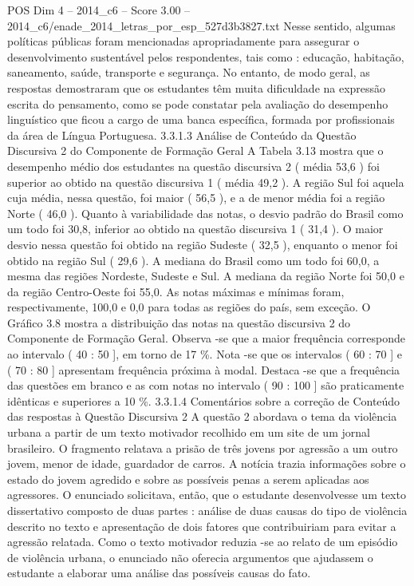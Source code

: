 \begin{textsample}{POS Dim 4 – 2014\_c6 – Score 3.00 – 2014\_c6/enade\_2014\_letras\_por\_esp\_527d3b3827.txt}
Nesse sentido, algumas políticas públicas foram mencionadas apropriadamente para assegurar o desenvolvimento sustentável pelos respondentes, tais como : educação, habitação, saneamento, saúde, transporte e segurança.
No entanto, de modo geral, as respostas demostraram que os estudantes têm muita dificuldade na expressão escrita do pensamento, como se pode constatar pela avaliação do desempenho linguístico que ficou a cargo de uma banca específica, formada por profissionais da área de Língua Portuguesa. 3.3.1.3 Análise de Conteúdo da Questão Discursiva 2 do Componente de Formação Geral A Tabela 3.13 mostra que o desempenho médio dos estudantes na questão discursiva 2 ( média 53,6 ) foi superior ao obtido na questão discursiva 1 ( média 49,2 ).
A região Sul foi aquela cuja média, nessa questão, foi maior ( 56,5 ), e a de menor média foi a região Norte ( 46,0 ).
Quanto à variabilidade das notas, o desvio padrão do Brasil como um todo foi 30,8, inferior ao obtido na questão discursiva 1 ( 31,4 ).
O maior desvio nessa questão foi obtido na região Sudeste ( 32,5 ), enquanto o menor foi obtido na região Sul ( 29,6 ).
A mediana do Brasil como um todo foi 60,0, a mesma das regiões Nordeste, Sudeste e Sul.
A mediana da região Norte foi 50,0 e da região Centro-Oeste foi 55,0.
As notas máximas e mínimas foram, respectivamente, 100,0 e 0,0 para todas as regiões do país, sem exceção.
O Gráfico 3.8 mostra a distribuição das notas na questão discursiva 2 do Componente de Formação Geral.
Observa -se que a maior frequência corresponde ao intervalo ( 40 : 50 ], em torno de 17 \%.
Nota -se que os intervalos ( 60 : 70 ] e ( 70 : 80 ] apresentam frequência próxima à modal.
Destaca -se que a frequência das questões em branco e as com notas no intervalo ( 90 : 100 ] são praticamente idênticas e superiores a 10 \%. 3.3.1.4 Comentários sobre a correção de Conteúdo das respostas à Questão Discursiva 2 A questão 2 abordava o tema da violência urbana a partir de um texto motivador recolhido em um site de um jornal brasileiro.
O fragmento relatava a prisão de três jovens por agressão a um outro jovem, menor de idade, guardador de carros.
A notícia trazia informações sobre o estado do jovem agredido e sobre as possíveis penas a serem aplicadas aos agressores.
O enunciado solicitava, então, que o estudante desenvolvesse um texto dissertativo composto de duas partes : análise de duas causas do tipo de violência descrito no texto e apresentação de dois fatores que contribuiriam para evitar a agressão relatada.
Como o texto motivador reduzia -se ao relato de um episódio de violência urbana, o enunciado não oferecia argumentos que ajudassem o estudante a elaborar uma análise das possíveis causas do fato.

\end{textsample}
